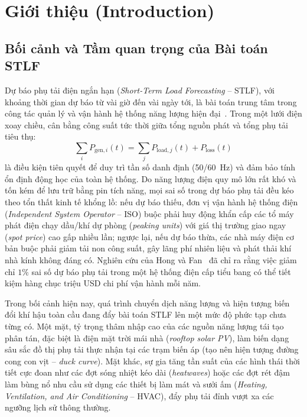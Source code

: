 \section{Giới thiệu (Introduction)}
\label{sec:introduction}

\subsection{Bối cảnh và Tầm quan trọng của Bài toán STLF}
Dự báo phụ tải điện ngắn hạn (\textit{Short-Term Load Forecasting} -- STLF), với khoảng thời gian dự báo từ vài giờ đến vài ngày tới, là bài toán trung tâm trong công tác quản lý và vận hành hệ thống năng lượng hiện đại~\cite{hong2016probabilistic}. Trong một lưới điện xoay chiều, cân bằng công suất tức thời giữa tổng nguồn phát và tổng phụ tải tiêu thụ:
\begin{equation}
    \sum_{i} P_{\text{gen}, i}(t) = \sum_{j} P_{\text{load}, j}(t) + P_{\text{loss}}(t)
\end{equation}
là điều kiện tiên quyết để duy trì tần số danh định (50/60~Hz) và đảm bảo tính ổn định động học của toàn hệ thống. Do năng lượng điện quy mô lớn rất khó và tốn kém để lưu trữ bằng pin tích năng, mọi sai số trong dự báo phụ tải đều kéo theo tổn thất kinh tế khổng lồ: nếu dự báo thiếu, đơn vị vận hành hệ thống điện (\textit{Independent System Operator} -- ISO) buộc phải huy động khẩn cấp các tổ máy phát điện chạy dầu/khí dự phòng (\textit{peaking units}) với giá thị trường giao ngay (\textit{spot price}) cao gấp nhiều lần; ngược lại, nếu dự báo thừa, các nhà máy điện cơ bản buộc phải giảm tải non công suất, gây lãng phí nhiên liệu và phát thải khí nhà kính không đáng có. Nghiên cứu của Hong và Fan~\cite{hong2016probabilistic} đã chỉ ra rằng việc giảm chỉ $1\%$ sai số dự báo phụ tải trong một hệ thống điện cấp tiểu bang có thể tiết kiệm hàng chục triệu USD chi phí vận hành mỗi năm.

Trong bối cảnh hiện nay, quá trình chuyển dịch năng lượng và hiện tượng biến đổi khí hậu toàn cầu đang đẩy bài toán STLF lên một mức độ phức tạp chưa từng có. Một mặt, tỷ trọng thâm nhập cao của các nguồn năng lượng tái tạo phân tán, đặc biệt là điện mặt trời mái nhà (\textit{rooftop solar PV}), làm biến dạng sâu sắc đồ thị phụ tải thực nhận tại các trạm biến áp (tạo nên hiện tượng đường cong con vịt -- \textit{duck curve}). Mặt khác, sự gia tăng tần suất của các hình thái thời tiết cực đoan như các đợt sóng nhiệt kéo dài (\textit{heatwaves}) hoặc các đợt rét đậm làm bùng nổ nhu cầu sử dụng các thiết bị làm mát và sưởi ấm (\textit{Heating, Ventilation, and Air Conditioning} -- HVAC), đẩy phụ tải đỉnh vượt xa các ngưỡng lịch sử thông thường.

